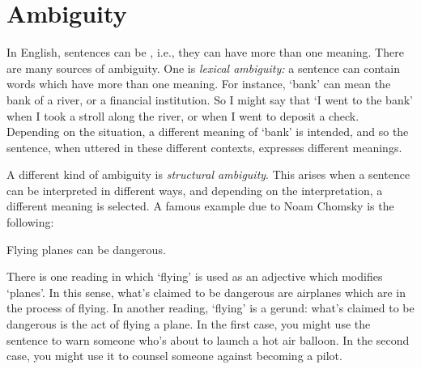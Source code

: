 \begin{practiceproblems}
\begin{earg}


\end{earg}



\end{practiceproblems}





\chapter{Ambiguity}\label{s:AmbiguityTFL}

In English, sentences can be , i.e., they can have more than one meaning.  There are many sources of ambiguity. One is \emph{lexical ambiguity:} a sentence can contain words which have more than one meaning.  For instance, `bank' can mean the bank of a river, or a financial institution. So I might say that `I went to the bank' when I took a stroll along the river, or when I went to deposit a check.  Depending on the situation, a different meaning of `bank' is intended, and so the sentence, when uttered in these different contexts, expresses different meanings.

A different kind of ambiguity is \emph{structural ambiguity}.  This arises when a sentence can be interpreted in different ways, and depending on the interpretation, a different meaning is selected.  A famous example due to Noam Chomsky is the following:
\begin{earg}
	\prem Flying planes can be dangerous.
\end{earg}
There is one reading in which `flying' is used as an adjective which modifies `planes'. In this sense, what's claimed to be dangerous are airplanes which are in the process of flying.  In another reading, `flying' is a gerund: what's claimed to be dangerous is the act of flying a plane.  In the first case, you might use the sentence to warn someone who's about to launch a hot air balloon.  In the second case, you might use it to counsel someone against becoming a pilot.

